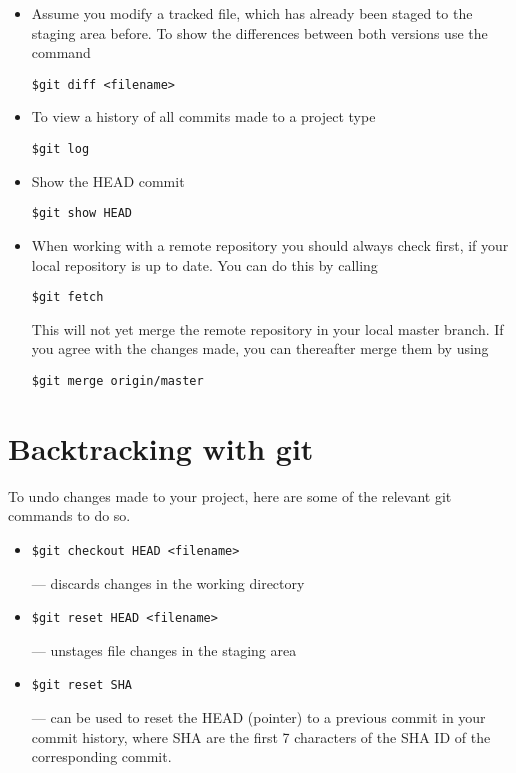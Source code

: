 \documentclass{article}
\begin{document}
\begin{itemize}

\item Assume you modify a tracked file, which has already been staged to the staging area before. To show the differences between both versions use the command
\begin{lstlisting}
$git diff <filename>
\end{lstlisting}

\item To view a history of all commits made to a project type
\begin{lstlisting}
$git log
\end{lstlisting}

\item Show the HEAD commit
\begin{lstlisting}
$git show HEAD
\end{lstlisting}

\item When working with a remote repository you should always check first, if your local repository is up to date.
You can do this by calling
\begin{lstlisting}
$git fetch
\end{lstlisting}
This will not yet merge the remote repository in your local master branch. If you agree with the changes made, you can thereafter merge them by using
\begin{lstlisting}
$git merge origin/master
\end{lstlisting}

\end{itemize}

\section{Backtracking with git}
To undo changes made to your project, here are some of the relevant git commands to do so.
\begin{itemize}

\item
\begin{lstlisting}
$git checkout HEAD <filename>
\end{lstlisting} --- discards changes in the working directory

\item 
\begin{lstlisting}
$git reset HEAD <filename>
\end{lstlisting}
--- unstages file changes in the staging area

\item 
\begin{lstlisting}
$git reset SHA
\end{lstlisting}
 --- can be used to reset the HEAD (pointer) to a previous commit in your commit history, where SHA are the first 7 characters of the SHA ID of the corresponding commit.
\end{itemize}
\end{document}
